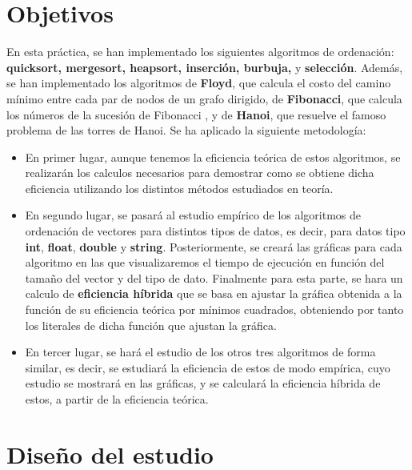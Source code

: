 \documentclass[11pt]{article}
\begin{document}
\section{Objetivos}
    En esta práctica, se han implementado los siguientes algoritmos de ordenación: \textbf{quicksort, mergesort, heapsort, inserción, burbuja,}
    y \textbf{selección}. Además, se han implementado los algoritmos de \textbf{Floyd}, que calcula el costo del camino mínimo entre cada par de nodos 
    de un grafo dirigido, de \textbf{Fibonacci}, que calcula los números de la sucesión de Fibonacci , y de \textbf{Hanoi}, que resuelve el famoso 
    problema de las torres de Hanoi. Se ha aplicado la siguiente metodología:
    \begin{itemize}
        \item En primer lugar, aunque tenemos la eficiencia teórica de estos algoritmos, se realizarán los calculos necesarios para demostrar
        como se obtiene dicha eficiencia utilizando los distintos métodos estudiados en teoría. \\
        
        \item En segundo lugar, se pasará al estudio empírico de los algoritmos de ordenación de vectores para distintos tipos de datos, es decir, 
        para datos tipo \textbf{int}, \textbf{float}, \textbf{double} y \textbf{string}. Posteriormente, se creará las gráficas para
        cada algoritmo en las que visualizaremos el tiempo de ejecución en función del tamaño del vector y del tipo de dato. Finalmente 
        para esta parte, se hara un calculo de \textbf{eficiencia híbrida} que se basa en ajustar la gráfica obtenida a la función de su eficiencia
        teórica por mínimos cuadrados, obteniendo por tanto los literales de dicha función que ajustan la gráfica.\\
        
        \item En tercer lugar, se hará el estudio de los otros tres algoritmos de forma similar, es decir, se estudiará la eficiencia
        de estos de modo empírica, cuyo estudio se mostrará en las gráficas, y se calculará la eficiencia híbrida de estos, a partir
        de la eficiencia teórica.\\     
    \end{itemize}
\section{Diseño del estudio}
\end{document}
